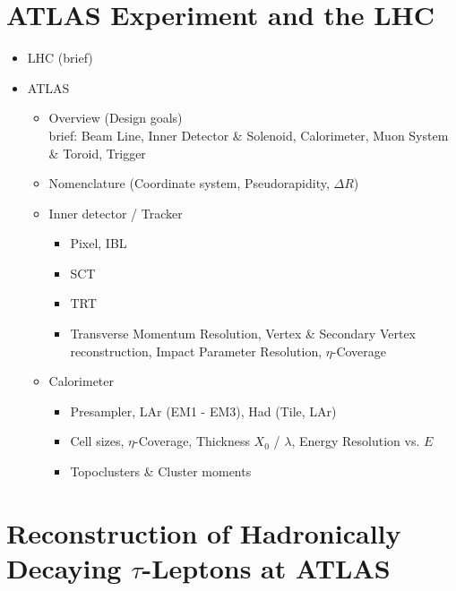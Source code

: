 \section{ATLAS Experiment and the LHC}

\begin{itemize}
\item LHC (brief)

\item ATLAS
  \begin{itemize}
  \item Overview (Design goals) \\
    brief: Beam Line, Inner Detector \& Solenoid, Calorimeter, Muon System \&
    Toroid, Trigger

  \item Nomenclature (Coordinate system, Pseudorapidity, $\Delta R$)

  \item Inner detector / Tracker
    \begin{itemize}
    \item Pixel, IBL
    \item SCT
    \item TRT
    \item  Transverse Momentum Resolution, Vertex \& Secondary Vertex
      reconstruction, Impact Parameter Resolution, $\eta$-Coverage
    \end{itemize}

  \item Calorimeter
    \begin{itemize}
    \item Presampler, LAr (EM1 - EM3), Had (Tile, LAr)
    \item Cell sizes, $\eta$-Coverage, Thickness $X_0$ / $\lambda$,
      Energy Resolution vs. $E$
    \item Topoclusters \& Cluster moments
    \end{itemize}

  \end{itemize}
\end{itemize}

\section{Reconstruction of Hadronically Decaying $\tau$-Leptons at ATLAS}

